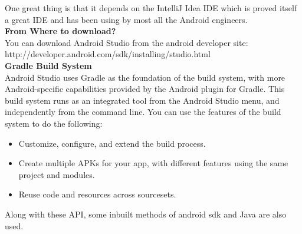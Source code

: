 \begin{itemize}
	One great thing is that it depends on the IntelliJ Idea IDE which is proved itself a great IDE and has been using by most all the Android engineers.\\
	\textbf{From Where to download?}\\
	You can download Android Studio from the android developer site:\\ http://developer.android.com/sdk/installing/studio.html
	\\
	\textbf{Gradle Build System}\\
	Android Studio uses Gradle as the foundation of the build system, with more Android-specific capabilities provided by the Android plugin for Gradle. This build system runs as an integrated tool from the Android Studio menu, and independently from the command line. You can use the features of the build system to do the following:
	\begin{itemize}
		\item Customize, configure, and extend the build process.
		\item Create multiple APKs for your app, with different features using the same project and modules.
		\item Reuse code and resources across sourcesets.
	\end{itemize}
\end{itemize}
Along with these API, some inbuilt methods of android sdk and Java are also used.
